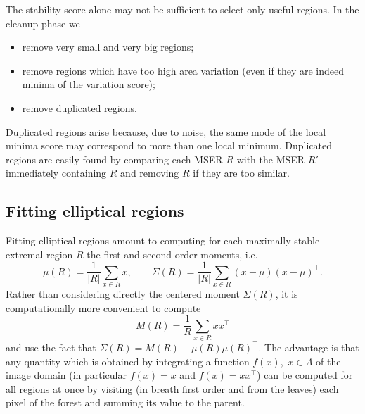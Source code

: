 \documentclass{article}
\begin{document}
The stability score alone may not be sufficient to select only useful regions. In the cleanup phase we
\begin{itemize}
\item remove very small and very big regions;
\item remove regions which have too high area variation (even if they are indeed minima of the variation score);
\item remove duplicated regions.
\end{itemize}
Duplicated regions arise because, due to noise, the same mode of the local minima score may correspond to more than one local minimum. Duplicated regions are easily found by comparing each MSER $R$ with the MSER $R'$ immediately containing $R$ and removing $R$ if they are too similar.

\subsection{Fitting elliptical regions}\label{sect:er.int}

Fitting elliptical regions amount to computing for each maximally stable extremal region $R$ the first and second order moments, i.e.
\[
 \mu(R) = \frac{1}{|R|} \sum_{x\in R} x,
 \qquad
 \Sigma(R) = \frac{1}{|R|} \sum_{x\in R} (x-\mu)(x-\mu)^\top.
\]
Rather than considering directly the centered moment $\Sigma(R)$, it is computationally more convenient to compute
\[
  M(R) = \frac{1}{R} \sum_{x\in R}xx^\top
\]
and use the fact that $\Sigma(R) = M(R) - \mu(R)\mu(R)^\top$. The advantage is that any quantity which is obtained by integrating a function $f(x),$ $x\in\Lambda$ of the image domain (in particular $f(x)=x$ and $f(x)=xx^\top$) can be computed for all regions at once by visiting (in breath first order and from the leaves) each pixel of the forest and summing its value to the parent.




\end{document}

